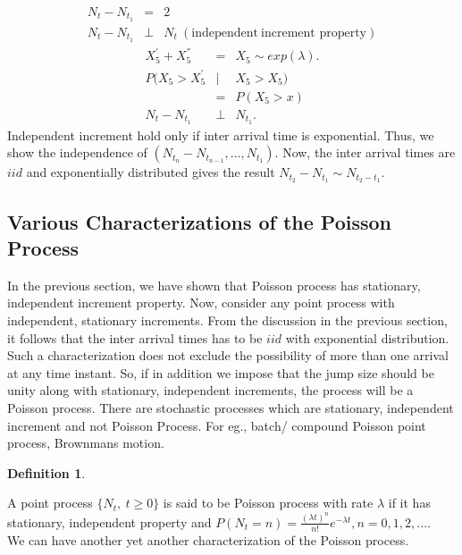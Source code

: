 \documentclass[a4paper,10pt]{article}
\theoremstyle{plain}
\theoremstyle{definition}
\newtheorem{defn}[thm]{Definition}
\begin{document}
\begin{eqnarray*}
  N_t-N_{t_{1}} &=& 2 \\
  N_t-N_{t_{1}} &\perp& N_t  ~(\text{independent}~ \text{increment property})
\end{eqnarray*}
\begin{eqnarray*}
  X_{5}^{'}+ X_{5}^{''}&=& X_{5} \sim exp(\lambda). \\
  P (X_{5}>X_{5}^{'} &|& X_{5}>X_{5}) \\
   &=&  P (X_{5} > x) \\
   N_t-N_{t_{1}} &\perp& N_{t_{1}}. 
\end{eqnarray*}
Independent increment hold only if inter arrival time is exponential. Thus, we show the independence of $(N_{t_{n}}-N_{t_{n-1}},...,N_{t_{1}})$. Now, the inter arrival times are $iid$ and exponentially distributed gives the result  $N_{t_{2}}-N_{t_{1}} \sim N_{t_{2}-t_{1}}$. 
\subsection{Various Characterizations of the Poisson Process}

\noindent In the previous section, we have shown that Poisson process has stationary, independent increment property. Now, consider any point process with independent, stationary increments. From the discussion in the previous section, it follows that the inter arrival times has to be $iid$ with exponential distribution. Such a characterization does not exclude the possibility of more than one arrival at any time instant. So, if in addition we impose that the jump size should be unity along with stationary, independent increments, the process will be a Poisson process. There are stochastic processes which are stationary, independent increment and not Poisson Process. For eg., batch/ compound Poisson point process, Brownmans motion.
\begin{defn}
\end{defn}
 A point process $\{N_t,~t\geq 0\}$ is said to be Poisson process with rate $\lambda$ if it has stationary, independent property and $P (N_{t}=n)= \frac{(\lambda t)^{n}}{n!} e^{-\lambda t}, n=0,1,2,....$\\

We can have another yet another characterization of the Poisson process.
\end{document}
